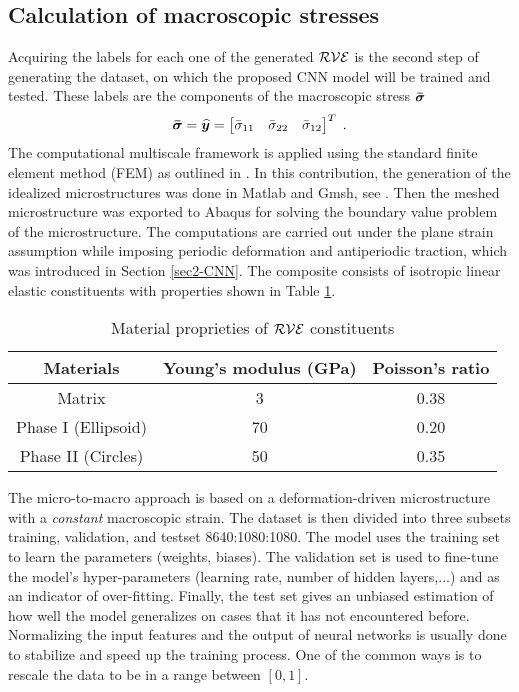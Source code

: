 \documentclass[final,3p,times]{elsarticle}
\begin{document}
\subsection{Calculation of macroscopic stresses}
Acquiring the labels for each one of the generated $\cal{RVE}$ is the second step of generating the dataset, on which the proposed CNN model will be trained and tested. These labels are the components of the macroscopic stress $\boldsymbol{\Bar{\sigma}}$
\def\c{\begin{bmatrix} \Bar{\sigma}_{11}& \Bar{\sigma}_{22}& \Bar{\sigma}_{12}\end{bmatrix}}
\begin{equation}
\boldsymbol{\Bar{\sigma}}= \boldsymbol{\widehat{y}} =\c^T \; .
\end{equation}
%
The computational multiscale framework is applied using the standard finite element method (FEM) as outlined in \citet{wriggers06}. In this contribution, the generation of the idealized microstructures was done in Matlab and Gmsh, see \cite{noii2022probabilistic}. Then the meshed microstructure was exported to Abaqus for solving the boundary value problem of the microstructure. The computations are carried out under the plane strain assumption while imposing periodic deformation and antiperiodic traction, which was introduced in Section \ref{sec2-CNN}. The composite consists of isotropic linear elastic constituents with properties shown in Table \ref{table:Material_proprieties}.
\begin{table}[h!]
	\centering
	\begin{tabular}{||c c c ||} 
		\hline
		Materials & Young's modulus (GPa) & Poisson's ratio  \\ [0.5ex] 
		\hline\hline
		Matrix & 3 & 0.38 \\ 
		\hline
		Phase I (Ellipsoid) & 70 & 0.20 \\
		\hline
		Phase II (Circles) & 50 & 0.35 \\
		\hline
	\end{tabular}
	\caption{Material proprieties of $\cal{RVE}$ constituents}
	\label{table:Material_proprieties}	
\end{table}
The micro-to-macro approach is based on a deformation-driven microstructure with a {\it constant} macroscopic strain. The dataset is then divided into three subsets training, validation, and testset 8640:1080:1080. The model uses the training set to learn the parameters (weights, biases). The validation set is used to fine-tune the model's hyper-parameters  (learning rate, number of hidden layers,...) and as an indicator of over-fitting. Finally, the test set gives an unbiased estimation of how well the model generalizes on cases that it has not encountered before. Normalizing the input features and the output of neural networks is usually done to stabilize and speed up the training process. One of the common ways is to rescale the data to be in a range between $[0,1]$.
\end{document}
